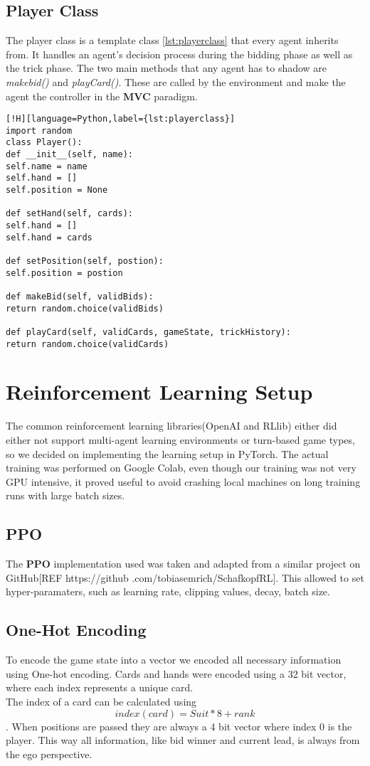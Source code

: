 \subsection{Player Class}
The player class is a template class \ref{lst:playerclass} that every agent inherits from.
It handles an agent's decision process during the bidding phase as well as the trick phase.
The two main methods that any agent has to shadow are \textit{makebid()} and \textit{playCard()}.
These are called by the environment and make the agent the controller in the \textbf{MVC} paradigm.
\newline
\begin{lstlisting}[!H][language=Python,label={lst:playerclass}]
import random
class Player():
def __init__(self, name):
self.name = name
self.hand = []
self.position = None

def setHand(self, cards):
self.hand = []
self.hand = cards

def setPosition(self, postion):
self.position = postion

def makeBid(self, validBids):
return random.choice(validBids)

def playCard(self, validCards, gameState, trickHistory):
return random.choice(validCards)
\end{lstlisting}
\section{Reinforcement Learning Setup}
The common reinforcement learning libraries(OpenAI and RLlib) either did either not support multi-agent learning
environments or turn-based game types, so we decided on implementing the learning setup in PyTorch.
The actual training was performed on Google Colab, even though our training was not very GPU intensive, it proved
useful to avoid crashing local machines on long training runs with large batch sizes.
\subsection{PPO}
The \textbf{PPO} implementation used was taken and adapted from a similar project on GitHub[REF https://github
.com/tobiasemrich/SchafkopfRL].
This allowed to set hyper-paramaters, such as learning rate, clipping values, decay, batch size.
\subsection{One-Hot Encoding}
To encode the game state into a vector we encoded all necessary information using One-hot encoding.
Cards and hands were encoded using a 32 bit vector, where each index represents a unique card.\\
The index of a card can be calculated using \[index(card) = Suit * 8 + rank\].
When positions are passed they are always a 4 bit vector where index 0 is the player.
This way all information, like bid winner and current lead, is always from the ego perspective.

